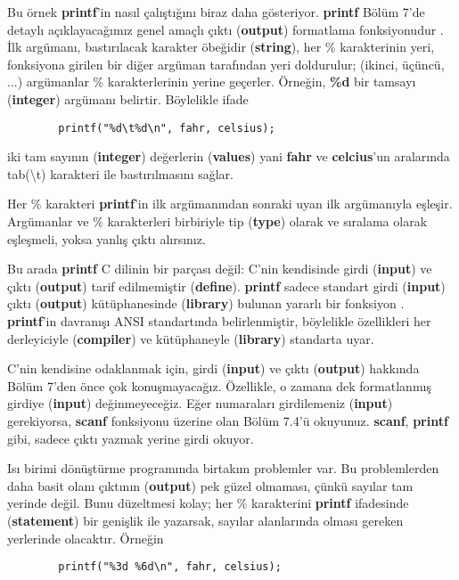 \documentclass[a4paper,12pt,oneside]{book}
\begin{document}
\par Bu örnek \textbf{printf}'in nasıl çalıştığını biraz daha gösteriyor. \textbf{printf} Bölüm 7'de detaylı açıklayacağımız genel amaçlı çıktı (\textbf{output}) formatlama fonksiyonudur . İlk argümanı,  bastırılacak karakter öbeğidir (\textbf{string}), her \% karakterinin yeri, fonksiyona  girilen bir diğer argüman  tarafından yeri doldurulur; (ikinci, üçüncü, ...) argümanlar  \% karakterlerinin yerine geçerler. Örneğin, \textbf{\%d} bir tamsayı (\textbf{integer}) argümanı  belirtir. Böylelikle ifade
\begin{lstlisting}
        printf("%d\t%d\n", fahr, celsius);
\end{lstlisting}
iki tam sayının (\textbf{integer}) değerlerin (\textbf{values}) yani \textbf{fahr} ve \textbf{celcius}'un aralarında tab(\textbackslash t) karakteri ile bastırılmasını sağlar.
\par Her \% karakteri \textbf{printf}'in ilk argümanından  sonraki uyan ilk argümanıyla  eşleşir. Argümanlar  ve \% karakterleri birbiriyle tip (\textbf{type}) olarak ve sıralama olarak eşleşmeli, yoksa yanlış çıktı alırsınız.
\par Bu arada \textbf{printf} C dilinin bir parçası değil: C'nin kendisinde girdi (\textbf{input}) ve çıktı (\textbf{output}) tarif edilmemiştir (\textbf{define}). \textbf{printf} sadece standart girdi (\textbf{input}) çıktı (\textbf{output}) kütüphanesinde (\textbf{library}) bulunan yararlı bir fonksiyon . \textbf{printf}'in davranışı ANSI standartında belirlenmiştir, böylelikle özellikleri her derleyiciyle (\textbf{compiler}) ve kütüphaneyle (\textbf{library}) standarta uyar.
\par C'nin kendisine odaklanmak için, girdi (\textbf{input}) ve çıktı (\textbf{output}) hakkında Bölüm 7'den önce çok konuşmayacağız. Özellikle, o zamana dek formatlanmış girdiye (\textbf{input}) değinmeyeceğiz. Eğer numaraları girdilemeniz (\textbf{input}) gerekiyorsa, \textbf{scanf} fonksiyonu  üzerine olan Bölüm 7.4'ü okuyunuz. \textbf{scanf}, \textbf{printf} gibi, sadece çıktı yazmak yerine girdi okuyor. \pagebreak
\par Isı birimi dönüştürme programında birtakım problemler var. Bu problemlerden daha basit olanı çıktının (\textbf{output}) pek güzel olmaması, çünkü sayılar tam yerinde değil. Bunu düzeltmesi kolay; her \% karakterini \textbf{printf} ifadesinde (\textbf{statement}) bir genişlik ile yazarsak, sayılar alanlarında olması gereken yerlerinde olacaktır.
Örneğin
\begin{lstlisting}
        printf("%3d %6d\n", fahr, celsius);
\end{lstlisting}
\end{document}
